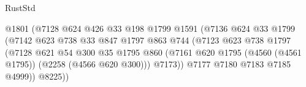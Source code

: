 \begin{lexlean}{RustStd}
\begin{coremodule}
                                                @1801
                                                (@7128
                                                  @624
                                                  @426
                                                  @33
                                                  @198
                                                  @1799
                                                  @1591
                                                  (@7136
                                                    @624
                                                    @33
                                                    @1799
                                                    (@7142
                                                      @623
                                                      @738
                                                      @33
                                                      @847
                                                      @1797
                                                      @863
                                                      @744
                                                      (@7123
                                                        @623
                                                        @738
                                                        @1797
                                                        (@7128
                                                          @621
                                                          @54
                                                          @300
                                                          @35
                                                          @1795
                                                          @860
                                                          (@7161
                                                            @620
                                                            @1795
                                                            (@4560 (@4561 @1795))
                                                            (@2258 (@4566 @620 @300)))
                                                          @7173))
                                                      @7177
                                                      @7180
                                                      @7183
                                                      @7185
                                                      @4999))
                                                  @8225))

\end{coremodule}
\end{lexlean}
